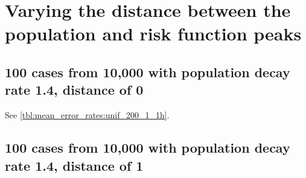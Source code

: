 \section{Varying the distance between the population and risk function peaks}

\subsection{100 cases from 10,000 with population decay rate 1.4, distance of 0}

See \autoref{tbl:mean_error_rates:unif_200_1_1h}.

\begin{table}[H]
\centering
\scriptsize

    \begin{subtable}{0.5\textwidth}
    
    \caption[]{Means} 
    \end{subtable}%
    \begin{subtable}{0.5\textwidth}
    
    \caption[]{Standard deviations} 
    \end{subtable}

\caption[]{Error rates for uniform population of 10,000, single peak intensity of factor 100 and decay rate 1.4, distance between population peak and risk peak is 0}
\label{tbl:mean_error_rates:p1.4_100_1_1h:2}
\end{table}

\subsection{100 cases from 10,000 with population decay rate 1.4, distance of 1}
\begin{table}[H]
\centering
\scriptsize

    \begin{subtable}{0.5\textwidth}
    
    \caption[]{Means} 
    \end{subtable}%
    \begin{subtable}{0.5\textwidth}
    
    \caption[]{Standard deviations} 
    \end{subtable}

\caption[]{Error rates for uniform population of 10,000, single peak intensity of factor 100 and decay rate 1.4, distance between population peak and risk peak is 1}
\label{tbl:mean_error_rates:p1.4_100_1_1h_1s}
\end{table}

